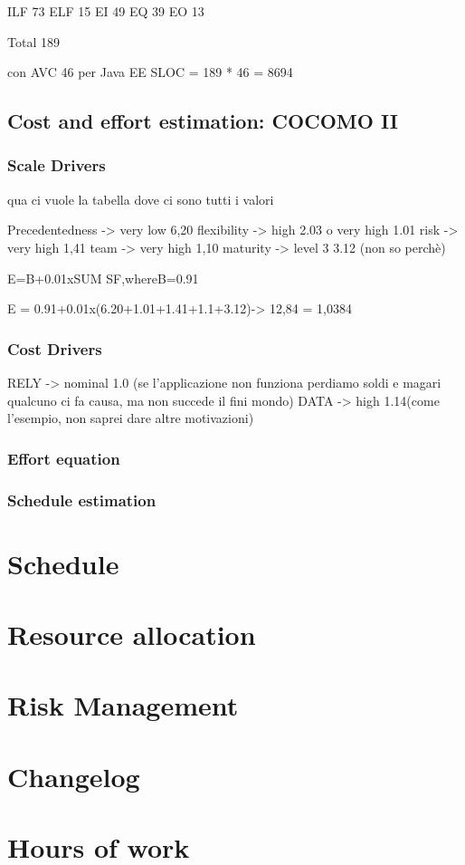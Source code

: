 \documentclass[english]{article}
\begin{document}
ILF 73
ELF 15
EI 49
EQ 39
EO 13

Total 189

con AVC 46 per Java EE
SLOC = 189 * 46 = 8694


\subsection{Cost and effort estimation: COCOMO II}


\subsubsection{Scale Drivers}

qua ci vuole la tabella dove ci sono tutti i valori

Precedentedness -> very low 6,20
flexibility -> high 2.03 o very high 1.01
risk -> very high 1,41
team -> very high 1,10
maturity -> level 3 3.12 (non so perchè)


E=B+0.01xSUM SF,whereB=0.91

E = 0.91+0.01x(6.20+1.01+1.41+1.1+3.12)-> 12,84 = 1,0384 

\subsubsection{Cost Drivers}

RELY -> nominal 1.0 (se l'applicazione non funziona perdiamo soldi e magari qualcuno ci fa causa, ma non succede il fini mondo)
DATA -> high 1.14(come l'esempio, non saprei dare altre motivazioni)


\subsubsection{Effort equation}

\subsubsection{Schedule estimation}


\section{Schedule}


\section{Resource allocation}


\section{Risk Management}

\appendix

\section{Changelog}

\section{Hours of work}
\end{document}
